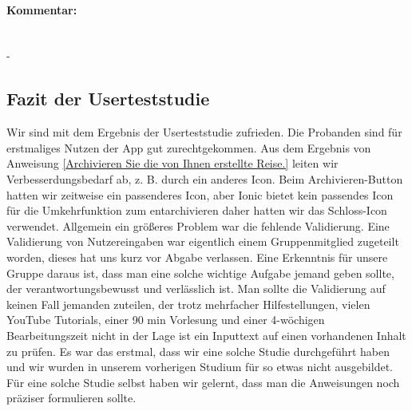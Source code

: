 	\paragraph{Kommentar:}\ \\
	-
	
\subsection{Fazit der Userteststudie}
Wir sind mit dem Ergebnis der Userteststudie zufrieden. Die Probanden sind für erstmaliges Nutzen der App gut zurechtgekommen. Aus dem Ergebnis von Anweisung \ref{Archivieren Sie die von Ihnen erstellte Reise.} leiten wir
Verbesserdungsbedarf ab, z. B. durch ein anderes Icon. Beim Archivieren-Button hatten wir
zeitweise ein passenderes Icon, aber Ionic bietet kein passendes Icon für die Umkehrfunktion zum entarchivieren daher hatten wir das Schloss-Icon verwendet.
Allgemein ein größeres Problem war die fehlende Validierung. Eine Validierung von Nutzereingaben war eigentlich einem Gruppenmitglied zugeteilt worden, dieses hat uns kurz vor Abgabe
verlassen. Eine Erkenntnis für unsere Gruppe daraus ist, dass man eine solche wichtige Aufgabe jemand geben sollte, der verantwortungsbewusst und verlässlich ist. Man sollte die Validierung
auf keinen Fall jemanden zuteilen, der trotz mehrfacher Hilfestellungen, vielen YouTube Tutorials, einer 90 min Vorlesung und einer 4-wöchigen Bearbeitungszeit nicht in der Lage ist ein
Inputtext auf einen vorhandenen Inhalt zu prüfen. 
Es war das erstmal, dass wir eine solche Studie durchgeführt haben und wir wurden in unserem vorherigen Studium für so etwas nicht ausgebildet. Für eine solche Studie selbst haben wir
gelernt, dass man die Anweisungen noch präziser formulieren sollte.
